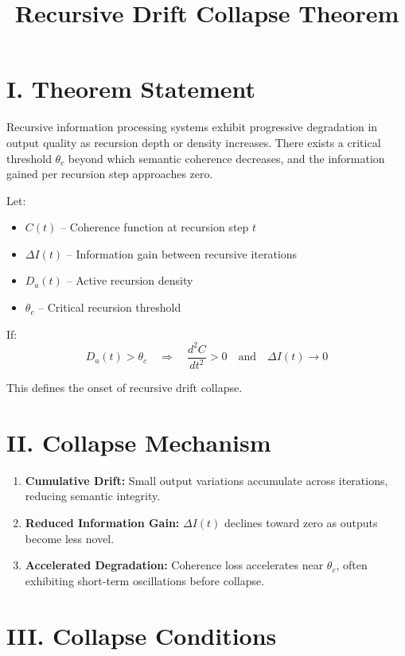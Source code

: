 \documentclass[12pt]{article}
\title{Recursive Drift Collapse Theorem}
\author{}
\date{}
\begin{document}
\maketitle

\section*{I. Theorem Statement}

Recursive information processing systems exhibit progressive degradation in output quality as recursion depth or density increases. There exists a critical threshold $\theta_c$ beyond which semantic coherence decreases, and the information gained per recursion step approaches zero.

Let:
\begin{itemize}
  \item $C(t)$ – Coherence function at recursion step $t$
  \item $\Delta I(t)$ – Information gain between recursive iterations
  \item $D_a(t)$ – Active recursion density
  \item $\theta_c$ – Critical recursion threshold
\end{itemize}

If:
\[
D_a(t) > \theta_c
\quad \Rightarrow \quad
\frac{d^2C}{dt^2} > 0 \quad \text{and} \quad \Delta I(t) \rightarrow 0
\]

This defines the onset of recursive drift collapse.

\section*{II. Collapse Mechanism}

\begin{enumerate}
  \item \textbf{Cumulative Drift:} Small output variations accumulate across iterations, reducing semantic integrity.
  \item \textbf{Reduced Information Gain:} $\Delta I(t)$ declines toward zero as outputs become less novel.
  \item \textbf{Accelerated Degradation:} Coherence loss accelerates near $\theta_c$, often exhibiting short-term oscillations before collapse.
\end{enumerate}

\section*{III. Collapse Conditions}
\end{document}
